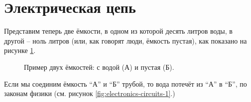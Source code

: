 \documentclass[../sparc.tex]{subfiles}
\begin{document}
\section{Электрическая цепь}

Представим теперь две ёмкости, в одном из которой десять литров воды, в другой --
ноль литров (или, как говорят люди, ёмкость пустая), как показано на рисунке
\ref{fig:electronics-circuits-0}.

\begin{figure}[ht]
  \centering
  \caption{Пример двух ёмкостей: с водой (А) и пустая (Б).}
  \label{fig:electronics-circuits-0}
\end{figure}

Если мы соединим ёмкость ``А'' и ``Б'' трубой, то вода потечёт из ``А'' в ``Б'',
по законам физики (см. рисунок \ref{fig:electronics-circuits-1}.)
\end{document}

